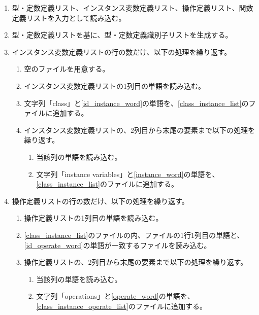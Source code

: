 \begin{enumerate}
    \item 型・定数定義リスト、インスタンス変数定義リスト、操作定義リスト、関数定義リストを入力として読み込む。
    \item 型・定数定義リストを基に、型・定数定義識別子リストを生成する。
    \item インスタンス変数定義リストの行の数だけ、以下の処理を繰り返す。
        \begin{enumerate}
            \item 空のファイルを用意する。
            \label{class_instance_list}
            \item インスタンス変数定義リストの1列目の単語を読み込む。
            \label{id_instance_word}
            \item 文字列「class」と\ref{id_instance_word}の単語を、\ref{class_instance_list}のファイルに追加する。
            \item インスタンス変数定義リストの、2列目から末尾の要素まで以下の処理を繰り返す。
                \begin{enumerate}
                    \item 当該列の単語を読み込む。
                    \label{instance_word}
                    \item 文字列「instance variables」と\ref{instance_word}の単語を、\ref{class_instance_list}のファイルに追加する。
                \end{enumerate}
        \end{enumerate}
    \item 操作定義リストの行の数だけ、以下の処理を繰り返す。
        \begin{enumerate}
            \item 操作定義リストの1列目の単語を読み込む。
            \label{id_operate_word}
            \item \ref{class_instance_list}のファイルの内、ファイルの1行1列目の単語と、\ref{id_operate_word}の単語が一致するファイルを読み込む。
            \label{class_instance_operate_list}
            \item 操作定義リストの、2列目から末尾の要素まで以下の処理を繰り返す。
                \begin{enumerate}
                    \item 当該列の単語を読み込む。
                    \label{operate_word}
                    \item 文字列「operations」と\ref{operate_word}の単語を、\ref{class_instance_operate_list}のファイルに追加する。

\end{enumerate}
\end{enumerate}
\end{enumerate}

